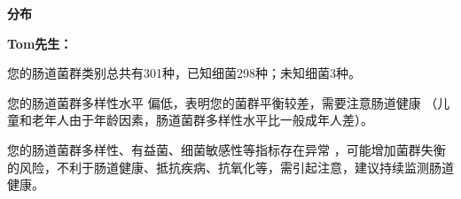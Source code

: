 

\usepackage{graphicx}
\graphicspath{{cores/}}



\setlength{\arrayrulewidth}{0.5pt}
\fontsize{9.3pt}{17pt}\selectfont
\color{gray2}

\vspace*{2mm}
\begin{center}
{\bf\sanhao 分布}
\end{center}

\medskip

\noindent
{\bf\xiaosihao Tom先生：}


\bigskip

您的肠道菌群类别总共有301种，已知细菌298种；未知细菌3种。

您的肠道菌群多样性水平
偏低，表明您的菌群平衡较差，需要注意肠道健康
（儿童和老年人由于年龄因素，肠道菌群多样性水平比一般成年人差）。

您的肠道菌群多样性、有益菌、细菌敏感性等指标存在异常
，可能增加菌群失衡的风险，不利于肠道健康、抵抗疾病、抗氧化等，需引起注意，建议持续监测肠道健康。


